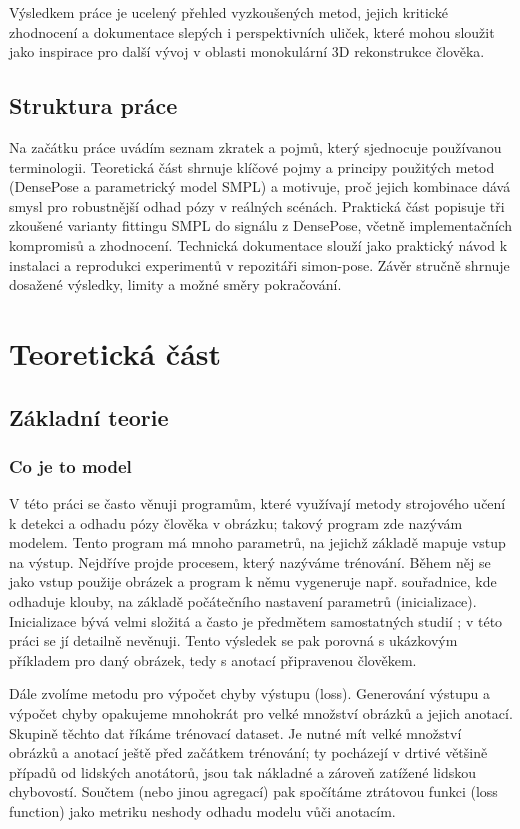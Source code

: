 \documentclass[11pt,a4paper,twoside,openright]{report}
\begin{document}
Výsledkem práce je ucelený přehled vyzkoušených metod, jejich kritické zhodnocení a dokumentace slepých i perspektivních uliček, které mohou sloužit jako inspirace pro další vývoj v oblasti monokulární 3D rekonstrukce člověka.

\section{Struktura práce}

Na začátku práce uvádím seznam zkratek a pojmů, který sjednocuje používanou terminologii. Teoretická část shrnuje klíčové pojmy a principy použitých metod (DensePose a parametrický model SMPL) a motivuje, proč jejich kombinace dává smysl pro robustnější odhad pózy v reálných scénách. Praktická část popisuje tři zkoušené varianty fittingu SMPL do signálu z DensePose, včetně implementačních kompromisů a zhodnocení. Technická dokumentace slouží jako praktický návod k instalaci a reprodukci experimentů v repozitáři simon-pose. Závěr stručně shrnuje dosažené výsledky, limity a možné směry pokračování.

\chapter{Teoretická část}
\pagestyle{fancy}

\section{Základní teorie}

\subsection{Co je to model}

V této práci se často věnuji programům, které využívají metody strojového učení k detekci a odhadu pózy člověka v obrázku; takový program zde nazývám modelem. Tento program má mnoho parametrů, na jejichž základě mapuje vstup na výstup. Nejdříve projde procesem, který nazýváme trénování. Během něj se jako vstup použije obrázek a program k němu vygeneruje např. souřadnice, kde odhaduje klouby, na základě počátečního nastavení parametrů (inicializace). Inicializace bývá velmi složitá a často je předmětem samostatných studií \cite{mishkin2016goodinit}; v této práci se jí detailně nevěnuji. Tento výsledek se pak porovná s ukázkovým příkladem pro daný obrázek, tedy s anotací připravenou člověkem.

Dále zvolíme metodu pro výpočet chyby výstupu (loss). Generování výstupu a výpočet chyby opakujeme mnohokrát pro velké množství obrázků a jejich anotací. Skupině těchto dat říkáme trénovací dataset. Je nutné mít velké množství obrázků a anotací ještě před začátkem trénování; ty pocházejí v drtivé většině případů od lidských anotátorů, jsou tak nákladné a zároveň zatížené lidskou chybovostí. Součtem (nebo jinou agregací) pak spočítáme ztrátovou funkci (loss function) jako metriku neshody odhadu modelu vůči anotacím.
\end{document}
